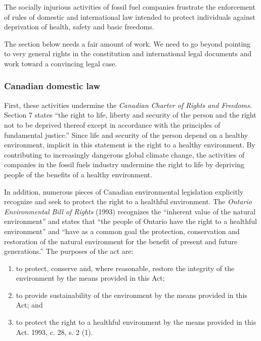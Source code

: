The socially injurious activities of fossil fuel companies frustrate the enforcement of rules of domestic and international law intended to protect individuals against deprivation of health, safety and basic freedoms.  



\begin{vcom}
	The section below needs a fair amount of work. We need to go beyond pointing to very general rights in the constitution and international legal documents and work toward a convincing legal case.
\end{vcom}



	\subsubsection{Canadian domestic law}


First, these activities undermine the \emph{Canadian Charter of Rights and Freedoms}.  
Section 7 states ``the right to life, liberty and security of the person and the right not to be deprived thereof except in accordance with the principles of fundamental justice.''   
Since life and security of the person depend on a healthy environment, implicit in this statement is the right to a healthy environment.  
By contributing to increasingly dangerous global climate change, the activities of companies in the fossil fuels industry undermine the right to life by depriving people of the benefits of a healthy environment.  



In addition, numerous pieces of Canadian environmental legislation explicitly recognize and seek to protect the right to a healthful environment.
The \emph{Ontario Environmental Bill of Rights} (1993) recognizes the ``inherent value of the natural environment'' and states that ``the people of Ontario have the right to a healthful environment'' and ``have as a common goal the protection, conservation and restoration of the natural environment for the benefit of present and future generations.''  
The purposes of the act are:
\begin{enumerate}
	\item to protect, conserve and, where reasonable, restore the integrity of the environment by the means provided in this Act;
	\item to provide sustainability of the environment by the means provided in this Act; and
	\item to protect the right to a healthful environment by the means provided in this Act.  1993, c. 28, s. 2 (1).
\end{enumerate}

